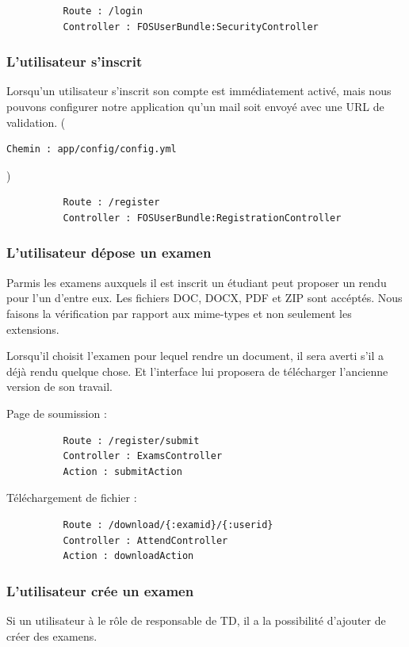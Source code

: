 \documentclass{report}
\begin{document}
        \begin{verbatim}
          Route : /login 
          Controller : FOSUserBundle:SecurityController
        \end{verbatim}
      \subsubsection{L'utilisateur s'inscrit}
        Lorsqu'un utilisateur s'inscrit son compte est immédiatement activé, mais nous
        pouvons configurer notre application qu'un mail soit envoyé avec une URL de
        validation. (\begin{verbatim}Chemin : app/config/config.yml\end{verbatim})
        
        \begin{verbatim}
          Route : /register 
          Controller : FOSUserBundle:RegistrationController  
        \end{verbatim}
      \subsubsection{L'utilisateur dépose un examen}
        Parmis les examens auxquels il est inscrit un étudiant peut proposer un rendu pour
        l'un d'entre eux. Les fichiers DOC, DOCX, PDF et ZIP sont accéptés. Nous faisons
        la vérification par rapport aux mime-types et non seulement les extensions.

        Lorsqu'il choisit l'examen pour lequel rendre un document, il sera averti s'il a
        déjà rendu quelque chose. Et l'interface lui proposera de télécharger l'ancienne
        version de son travail.

        Page de soumission :
        \begin{verbatim}
          Route : /register/submit
          Controller : ExamsController
          Action : submitAction
        \end{verbatim}
        Téléchargement de fichier :
        \begin{verbatim}
          Route : /download/{:examid}/{:userid}
          Controller : AttendController
          Action : downloadAction
        \end{verbatim}
      \subsubsection{L'utilisateur crée un examen}
        Si un utilisateur à le rôle de responsable de TD, il a la possibilité d'ajouter
        de créer des examens.
        
\end{document}
